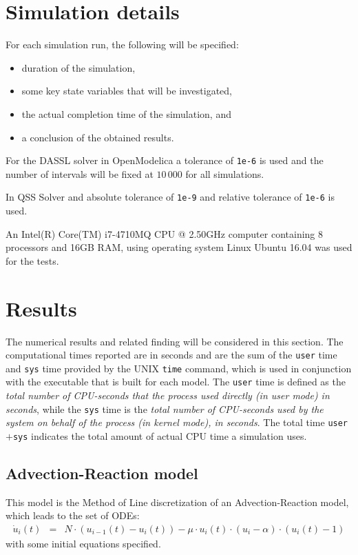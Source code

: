 \documentclass[10pt]{article}
\begin{document}
\section{Simulation details}

For each simulation run, the following will be specified:
\begin{itemize}
 \item duration of the simulation,
 \item some key state variables that will be investigated,
 \item the actual completion time of the simulation, and
 \item a conclusion of the obtained results.
\end{itemize}

For the DASSL solver in OpenModelica a tolerance of {\tt{1e-6}} is used and the number of intervals will be fixed at $10\,000$ for all simulations.

In QSS Solver and absolute tolerance of {\tt{1e-9}} and relative tolerance of {\tt{1e-6}} is used.

An Intel(R) Core(TM) i7-4710MQ CPU @ 2.50GHz computer containing 8 processors and 16GB RAM,
using operating system Linux Ubuntu 16.04 was used for the tests.



\section{Results}

The numerical results and related finding will be considered in this section. The computational times reported are in seconds and are the sum of the {\tt{user}} time and {\tt{sys}} time provided by the UNIX {\tt{time}} command, which is used in conjunction with the executable that is built for each model. The {\tt{user}} time is defined as the {\em total number of CPU-seconds that the process used directly (in user mode) in seconds}, while the {\tt{sys}} time is the {\em total number of CPU-seconds used by the system on behalf of the process (in kernel mode), in seconds}. The total time {\tt{user}}$+${\tt{sys}} indicates the total amount of actual CPU time a simulation uses.

\newpage

\subsection{Advection-Reaction model}

This model is the Method of Line discretization of an Advection-Reaction model, which leads to the set of ODEs:
\begin{eqnarray*}
 \dot{u}_i(t) &=& N\cdot(u_{i-1}(t) - u_i(t)) - \mu \cdot u_i(t) \cdot (u_i - \alpha)\cdot (u_i(t) - 1)
\end{eqnarray*}
with some initial equations specified.
\end{document}
